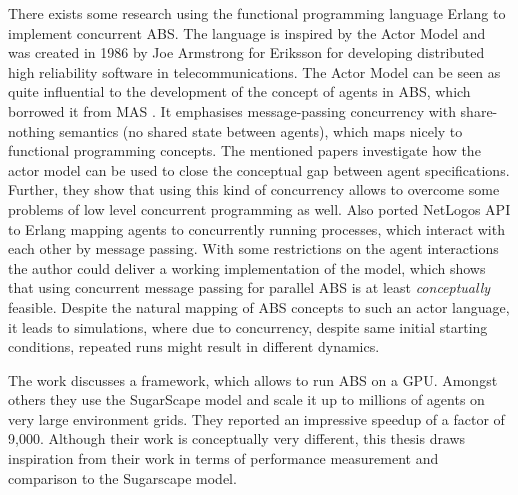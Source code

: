 There exists some research \cite{di_stefano_using_2005, sher_agent-based_2013, varela_modelling_2004} using the functional programming language Erlang \cite{armstrong_erlang_2010} to implement concurrent ABS. The language is inspired by the Actor Model \cite{agha_actors:_1986} and was created in 1986 by Joe Armstrong for Eriksson for developing distributed high reliability software in telecommunications. The Actor Model can be seen as quite influential to the development of the concept of agents in ABS, which borrowed it from MAS \cite{wooldridge_introduction_2009}. It emphasises message-passing concurrency with share-nothing semantics (no shared state between agents), which maps nicely to functional programming concepts. The mentioned papers investigate how the actor model can be used to close the conceptual gap between agent specifications. Further, they show that using this kind of concurrency allows to overcome some problems of low level concurrent programming as well.
Also \cite{bezirgiannis_improving_2013} ported NetLogos API to Erlang mapping agents to concurrently running processes, which interact with each other by message passing. With some restrictions on the agent interactions the author could deliver a working implementation of the model, which shows that using concurrent message passing for parallel ABS is at least \textit{conceptually} feasible. Despite the natural mapping of ABS concepts to such an actor language, it leads to simulations, where due to concurrency, despite same initial starting conditions, repeated runs might result in different dynamics.

The work \cite{lysenko_framework_2008} discusses a framework, which allows to run ABS on a GPU. Amongst others they use the SugarScape model \cite{epstein_growing_1996} and scale it up to millions of agents on very large environment grids. They reported an impressive speedup of a factor of 9,000. Although their work is conceptually very different, this thesis draws inspiration from their work in terms of performance measurement and comparison to the Sugarscape model.


